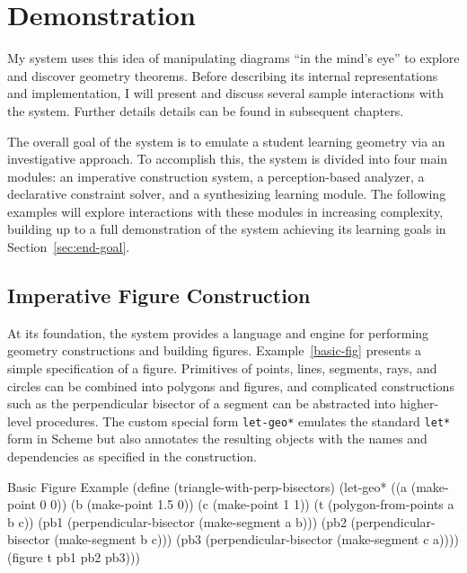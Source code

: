 \chapter{Demonstration}
\label{chap:demo}

My system uses this idea of manipulating diagrams ``in the mind's
eye'' to explore and discover geometry theorems. Before describing its
internal representations and implementation, I will present and
discuss several sample interactions with the system. Further details
details can be found in subsequent chapters.

The overall goal of the system is to emulate a student learning
geometry via an investigative approach. To accomplish this, the system
is divided into four main modules: an imperative construction system,
a perception-based analyzer, a declarative constraint solver, and a
synthesizing learning module.  The following examples will explore
interactions with these modules in increasing complexity, building up
to a full demonstration of the system achieving its learning goals in
Section~\ref{sec:end-goal}.

\section{Imperative Figure Construction}

\enlargethispage*{\baselineskip}

At its foundation, the system provides a language and engine for
performing geometry constructions and building figures.
Example~\ref{basic-fig} presents a simple specification of a
figure. Primitives of points, lines, segments, rays, and circles can
be combined into polygons and figures, and complicated constructions
such as the perpendicular bisector of a segment can be abstracted into
higher-level procedures. The custom special form \texttt{let-geo*}
emulates the standard \texttt{let*} form in Scheme but also annotates
the resulting objects with the names and dependencies as specified in
the construction.

\pagebreak

\begin{code-example}
[label=basic-fig]
{Basic Figure Example}
(define (triangle-with-perp-bisectors)
  (let-geo* ((a (make-point 0 0))
             (b (make-point 1.5 0))
             (c (make-point 1 1))
             (t (polygon-from-points a b c))
             (pb1 (perpendicular-bisector (make-segment a b)))
             (pb2 (perpendicular-bisector (make-segment b c)))
             (pb3 (perpendicular-bisector (make-segment c a))))
    (figure t pb1 pb2 pb3)))
\end{code-example}


